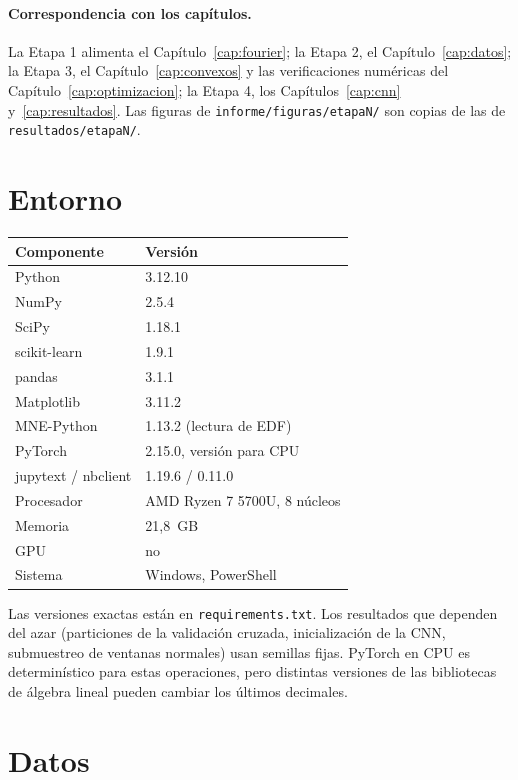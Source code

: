 \paragraph{Correspondencia con los capítulos.} La Etapa 1 alimenta el Capítulo~\ref{cap:fourier}; la Etapa 2, el
Capítulo~\ref{cap:datos}; la Etapa 3, el Capítulo~\ref{cap:convexos} y las verificaciones numéricas del
Capítulo~\ref{cap:optimizacion}; la Etapa 4, los Capítulos~\ref{cap:cnn} y~\ref{cap:resultados}. Las figuras de
\texttt{informe/figuras/etapaN/} son copias de las de \texttt{resultados/etapaN/}.

\section{Entorno}

\begin{center}
\begin{tabular}{ll}
\toprule
Componente & Versión \\
\midrule
Python        & 3.12.10 \\
NumPy         & 2.5.4 \\
SciPy         & 1.18.1 \\
scikit-learn  & 1.9.1 \\
pandas        & 3.1.1 \\
Matplotlib    & 3.11.2 \\
MNE-Python    & 1.13.2 (lectura de EDF) \\
PyTorch       & 2.15.0, versión para CPU \\
jupytext / nbclient & 1.19.6 / 0.11.0 \\
\midrule
Procesador    & AMD Ryzen 7 5700U, 8 núcleos \\
Memoria       & 21,8~GB \\
GPU           & no \\
Sistema       & Windows, PowerShell \\
\bottomrule
\end{tabular}
\end{center}

Las versiones exactas están en \texttt{requirements.txt}. Los resultados que dependen del azar (particiones de la validación
cruzada, inicialización de la CNN, submuestreo de ventanas normales) usan semillas fijas. PyTorch en CPU es determinístico
para estas operaciones, pero distintas versiones de las bibliotecas de álgebra lineal pueden cambiar los últimos decimales.

\section{Datos}

